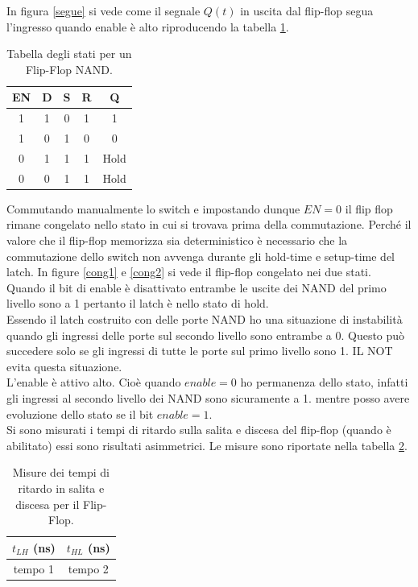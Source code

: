 \documentclass[10pt,a4paper]{article}
\begin{document}
In figura \ref{segue} si vede come il segnale $Q(t)$ in uscita dal flip-flop segua l'ingresso quando enable è alto riproducendo la tabella \ref{stati2}.\\

\begin{table}[!htb]
\centering
\begin{tabular}{|c|c|c|c|c|}
\hline 
EN & D & S & R & Q\\ 
\hline 
1 & 1 & 0 & 1 & 1\\ 
\hline 
1 & 0 & 1 & 0 & 0\\ 
\hline 
0 & 1 & 1 & 1 & Hold\\ 
\hline 
0 & 0 & 1 & 1 & Hold\\ 
\hline 
\end{tabular}
\caption{Tabella degli stati per un Flip-Flop NAND. \label{stati2}}
\end{table}


Commutando manualmente lo switch e impostando dunque $EN = 0$ il flip flop rimane congelato nello stato in cui si trovava prima della commutazione.
Perché il valore che il flip-flop memorizza sia deterministico è necessario che la commutazione dello switch non avvenga durante gli hold-time e setup-time del latch. In figure \ref{cong1} e \ref{cong2} si vede il flip-flop congelato nei due stati. Quando il bit di enable è disattivato entrambe le uscite dei NAND del primo livello sono a 1 pertanto il latch è nello stato di hold.\\

Essendo il latch costruito con delle porte NAND ho una situazione di instabilità quando gli ingressi delle porte sul secondo livello sono entrambe a 0. Questo può succedere solo se gli ingressi di tutte le porte sul primo livello sono 1. IL NOT evita questa situazione.\\
L'enable è attivo alto. Cioè quando $enable = 0$ ho permanenza dello stato, infatti gli ingressi al secondo livello dei NAND sono sicuramente a 1. mentre posso avere evoluzione dello stato se il bit $enable = 1$.\\

Si sono misurati i tempi di ritardo sulla salita e discesa del flip-flop (quando è abilitato) essi sono risultati asimmetrici. Le misure sono riportate nella tabella \ref{ritardo}.

\begin{table}[!htb]
\centering
\begin{tabular}{|c|c|}
\hline 
$t_{LH}$ (ns) & $t_{HL}$ (ns)\\
\hline
tempo 1 & tempo 2\\
\hline
\end{tabular}
\caption{Misure dei tempi di ritardo in salita e discesa per il Flip-Flop.\label{ritardo}}
\end{table}
\end{document}
